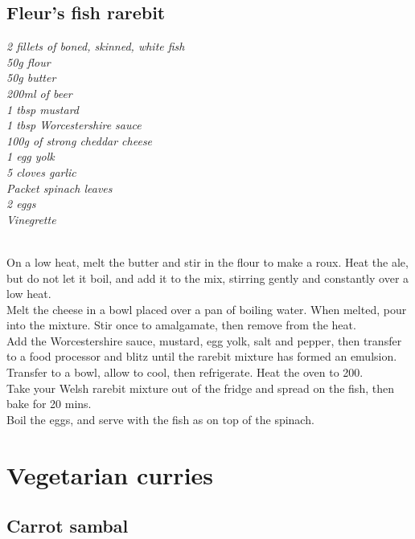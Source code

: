 \documentclass{tufte-book}
\begin{document}
\section{Fleur's fish rarebit}

\emph{2 fillets of boned, skinned, white fish
\\50g flour
\\50g butter
\\200ml of beer
\\1 tbsp mustard
\\1 tbsp Worcestershire sauce
\\100g of strong cheddar cheese
\\1 egg yolk
\\5 cloves garlic
\\Packet spinach leaves
\\2 eggs
\\Vinegrette
}

\smallskip
{} 
\\On a low heat, melt the butter and stir in the flour to make a roux. Heat the ale, but do not let it boil, and add it to the mix, stirring gently and constantly over a low heat.
\\Melt the cheese in a bowl placed over a pan of boiling water. When melted, pour into the mixture. Stir once to amalgamate, then remove from the heat.
\\Add the Worcestershire sauce, mustard, egg yolk, salt and pepper, then transfer to a food processor and blitz until the rarebit mixture has formed an emulsion. Transfer to a bowl, allow to cool, then refrigerate.
Heat the oven to 200\celsius.
\\Take your Welsh rarebit mixture out of the fridge and spread on the fish, then bake for 20 mins.
\\Boil the eggs, and serve with the fish as on top of the spinach.

\chapter{Vegetarian curries}

\section{Carrot sambal}
\end{document}
